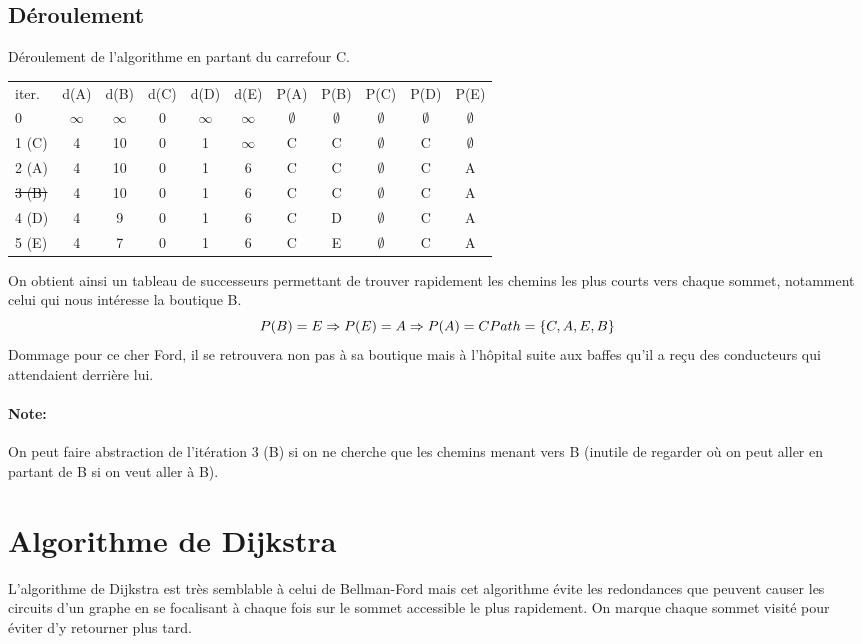 \documentclass[11pt]{extarticle}
\begin{document}
\subsection{Déroulement}
Déroulement de l'algorithme en partant du carrefour C.\\
\begin{center}
\begin{tabular*}{0.95\textwidth}{|l|c|c|c|c|c||c|c|c|c|c|}
 \rowcolor{light_green} iter. & d(A) & d(B) & d(C) & d(D) & d(E) & P(A)& P(B)& P(C)& P(D)& P(E) \\
  \rowcolor{light_green2} 0 & $\infty$ & $\infty$ & 0 & $\infty$ & $\infty$ & $\emptyset$ & $\emptyset$ & $\emptyset$ & $\emptyset$ & $\emptyset$ \\
   \rowcolor{light_green2} 1 (C) & 4 & 10 & 0 & 1 & $\infty$ & C & C & $\emptyset$ & C & $\emptyset$ \\
   \rowcolor{light_green2} 2 (A) & 4 & 10 & 0 & 1 & 6 & C & C & $\emptyset$ & C & A \\
   \rowcolor{light_gray} \sout{3 (B)} & 4 & 10 & 0 & 1 & 6 & C & C & $\emptyset$ & C & A \\
   \rowcolor{light_green2}  4 (D) & 4 & 9 & 0 & 1 & 6 & C & D & $\emptyset$ & C & A \\
   \rowcolor{light_green2}  5 (E) & 4 & 7 & 0 & 1 & 6 & C & E & $\emptyset$ & C & A \\
 \end{tabular*}
\end{center}
On obtient ainsi un tableau de successeurs permettant de trouver rapidement les chemins les plus courts vers chaque sommet, notamment celui qui nous intéresse la boutique B. 
\[
 P(B) = E \Rightarrow P(E) = A \Rightarrow P(A) = C \\
 Path = \{C, A, E, B\}
\]
Dommage pour ce cher Ford, il se retrouvera non pas à sa boutique mais à l'hôpital suite aux baffes qu'il a reçu des conducteurs qui attendaient derrière lui.
\paragraph{\textbf{Note:}} On peut faire abstraction de l'itération 3 (B) si on ne cherche que les chemins menant vers B (inutile de regarder où on peut aller en partant de B si on veut aller à B).
\section{Algorithme de Dijkstra}
L'algorithme de Dijkstra est très semblable à celui de Bellman-Ford mais cet algorithme évite les redondances que peuvent causer les circuits d'un graphe en se focalisant à chaque fois sur le sommet accessible le plus rapidement. On marque chaque sommet visité pour éviter d'y retourner plus tard.
\end{document}

